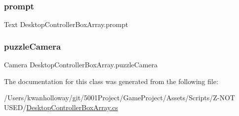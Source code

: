 \mbox{\label{class_desktop_controller_box_array_a947a69388f64d8e59d2836f0836a9538}} 
\subsubsection{\texorpdfstring{prompt}{prompt}}
{\footnotesize\ttfamily Text Desktop\+Controller\+Box\+Array.\+prompt}

\mbox{\label{class_desktop_controller_box_array_aceb8f6d6249766e34162daa8fb358b3a}} 
\subsubsection{\texorpdfstring{puzzle\+Camera}{puzzleCamera}}
{\footnotesize\ttfamily Camera Desktop\+Controller\+Box\+Array.\+puzzle\+Camera}



The documentation for this class was generated from the following file\+:\begin{DoxyCompactItemize}
\item 
/\+Users/kwanholloway/git/5001\+Project/\+Game\+Project/\+Assets/\+Scripts/\+Z-\/\+N\+O\+T U\+S\+E\+D/\hyperlink{_desktop_controller_box_array_8cs}{Desktop\+Controller\+Box\+Array.\+cs}\end{DoxyCompactItemize}
